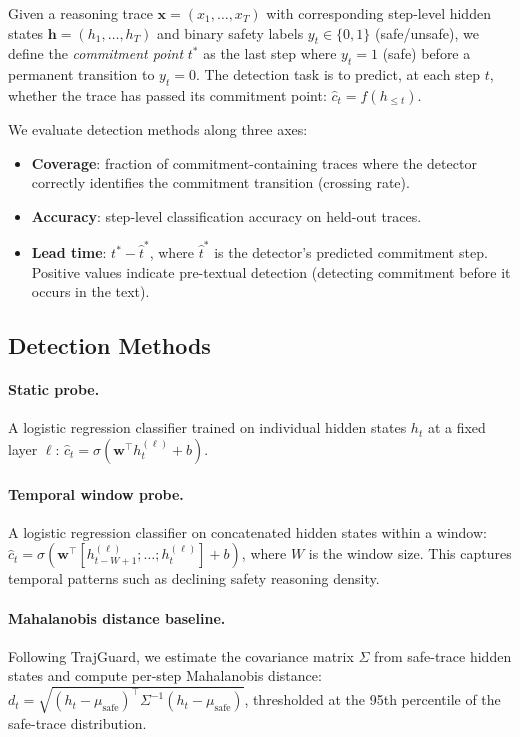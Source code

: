 \documentclass[11pt,a4paper]{article}
\begin{document}
Given a reasoning trace $\mathbf{x} = (x_1, \ldots, x_T)$ with corresponding step-level hidden states $\mathbf{h} = (h_1, \ldots, h_T)$ and binary safety labels $y_t \in \{0, 1\}$ (safe/unsafe), we define the \emph{commitment point} $t^*$ as the last step where $y_t = 1$ (safe) before a permanent transition to $y_t = 0$.
The detection task is to predict, at each step $t$, whether the trace has passed its commitment point: $\hat{c}_t = f(h_{\leq t})$.

We evaluate detection methods along three axes:
\begin{itemize}
\item \textbf{Coverage}: fraction of commitment-containing traces where the detector correctly identifies the commitment transition (crossing rate).
\item \textbf{Accuracy}: step-level classification accuracy on held-out traces.
\item \textbf{Lead time}: $t^* - \hat{t}^*$, where $\hat{t}^*$ is the detector's predicted commitment step. Positive values indicate pre-textual detection (detecting commitment before it occurs in the text).
\end{itemize}

\subsection{Detection Methods}

\paragraph{Static probe.}
A logistic regression classifier trained on individual hidden states $h_t$ at a fixed layer $\ell$: $\hat{c}_t = \sigma(\mathbf{w}^\top h_t^{(\ell)} + b)$.

\paragraph{Temporal window probe.}
A logistic regression classifier on concatenated hidden states within a window: $\hat{c}_t = \sigma(\mathbf{w}^\top [h_{t-W+1}^{(\ell)}; \ldots; h_t^{(\ell)}] + b)$, where $W$ is the window size. This captures temporal patterns such as declining safety reasoning density.

\paragraph{Mahalanobis distance baseline.}
Following TrajGuard, we estimate the covariance matrix $\Sigma$ from safe-trace hidden states and compute per-step Mahalanobis distance: $d_t = \sqrt{(h_t - \mu_{\text{safe}})^\top \Sigma^{-1} (h_t - \mu_{\text{safe}})}$, thresholded at the 95th percentile of the safe-trace distribution.
\end{document}
